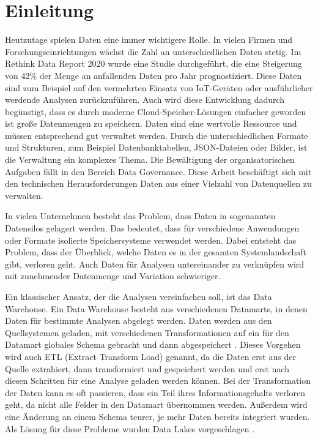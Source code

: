 \chapter{Einleitung}

Heutzutage spielen Daten eine immer wichtigere Rolle.
In vielen Firmen und Forschungseinrichtungen wächst die Zahl an unterschiedlichen Daten stetig.
Im Rethink Data Report 2020 \parencite{rethink_data_2020} wurde eine Studie durchgeführt, die eine Steigerung von 42\% der Menge an anfallenden Daten pro Jahr prognostiziert.
Diese Daten sind zum Beispiel auf den vermehrten Einsatz von IoT-Geräten oder ausführlicher werdende Analysen zurückzuführen.
Auch wird diese Entwicklung dadurch begünstigt, dass es durch moderne Cloud-Speicher-Lösungen einfacher geworden ist große Datenmengen zu speichern.
Daten sind eine wertvolle Ressource und müssen entsprechend gut verwaltet werden.
Durch die unterschiedlichen Formate und Strukturen, zum Beispiel Datenbanktabellen, JSON-Dateien oder Bilder, ist die Verwaltung ein komplexes Thema.
Die Bewältigung der organisatorischen Aufgaben fällt in den Bereich Data Governance.
Diese Arbeit beschäftigt sich mit den technischen Herausforderungen Daten aus einer Vielzahl von Datenquellen zu verwalten.

In vielen Unternehmen besteht das Problem, dass Daten in sogenannten Datensilos gelagert werden.
Das bedeutet, dass für verschiedene Anwendungen oder Formate isolierte Speichersysteme verwendet werden.
Dabei entsteht das Problem, dass der Überblick, welche Daten es in der gesamten Systemlandschaft gibt, verloren geht.
Auch Daten für Analysen untereinander zu verknüpfen wird mit zunehmender Datenmenge und Variation schwieriger.

Ein klassischer Ansatz, der die Analysen vereinfachen soll, ist das Data Warehouse.
Ein Data Warehouse besteht aus verschiedenen Datamarts, in denen Daten für bestimmte Analysen abgelegt werden.
Daten werden aus den Quellsystemen geladen, mit verschiedenen Transformationen auf ein für den Datamart globales Schema gebracht und dann abgespeichert \parencite{dw}.
Dieses Vorgehen wird auch ETL (Extract Transform Load) genannt, da die Daten erst aus der Quelle extrahiert, dann transformiert und gespeichert werden und erst nach diesen Schritten für eine Analyse geladen werden können.
Bei der Transformation der Daten kann es oft passieren, dass ein Teil ihres Informationsgehalts verloren geht, da nicht alle Felder in den Datamart übernommen werden.
Außerdem wird eine Änderung an einem Schema teurer, je mehr Daten bereits integriert wurden.
Als Lösung für diese Probleme wurden Data Lakes vorgeschlagen \parencite{dixon2010pentaho,datalake_03}.

